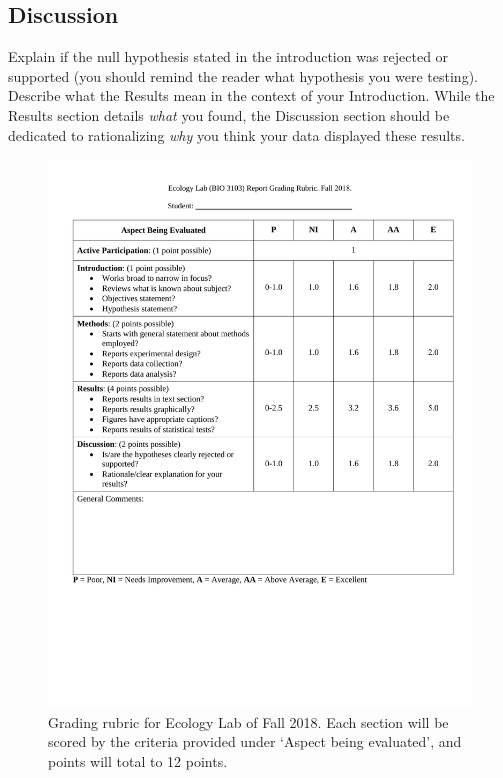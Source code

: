 \documentclass[11pt,]{article}
\makeatletter
\def\maxwidth{\ifdim\Gin@nat@width>\linewidth\linewidth
\else\Gin@nat@width\fi}
\let\Oldincludegraphics\includegraphics
\renewcommand{\includegraphics}[1]{\Oldincludegraphics[width=\maxwidth]{#1}}
\makeatother
\begin{document}
\subsection{Discussion}\label{discussion}

Explain if the null hypothesis stated in the introduction was rejected
or supported (you should remind the reader what hypothesis you were
testing). Describe what the Results mean in the context of your
Introduction. While the Results section details \emph{what} you found,
the Discussion section should be dedicated to rationalizing \emph{why}
you think your data displayed these results.\\
\newpage

\begin{figure}
\centering
\includegraphics{Grading_rubric.pdf}
\caption{Grading rubric for Ecology Lab of Fall 2018. Each section will
be scored by the criteria provided under `Aspect being evaluated', and
points will total to 12 points.}
\end{figure}
\end{document}
